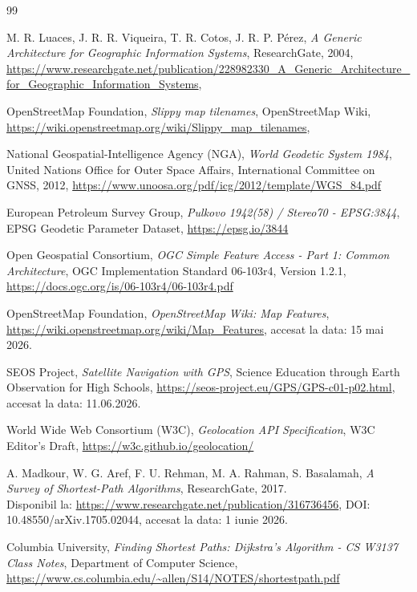 ﻿\documentclass[12pt, a4paper, twoside, romanian]{teza-upb}
\begin{document}
\begin{thebibliography}{99}


M. R. Luaces, J. R. R. Viqueira, T. R. Cotos, J. R. P. Pérez,
\emph{A Generic Architecture for Geographic Information Systems},
ResearchGate, 2004,
\url{https://www.researchgate.net/publication/228982330_A_Generic_Architecture_for_Geographic_Information_Systems},



OpenStreetMap Foundation,
\emph{Slippy map tilenames},
OpenStreetMap Wiki,
\url{https://wiki.openstreetmap.org/wiki/Slippy_map_tilenames},


National Geospatial-Intelligence Agency (NGA),
\emph{World Geodetic System 1984},
United Nations Office for Outer Space Affairs, International Committee on GNSS, 2012,
\url{https://www.unoosa.org/pdf/icg/2012/template/WGS_84.pdf}

European Petroleum Survey Group,
\emph{Pulkovo 1942(58) / Stereo70 - EPSG:3844},
EPSG Geodetic Parameter Dataset,
\url{https://epsg.io/3844}


Open Geospatial Consortium,
\emph{OGC Simple Feature Access - Part 1: Common Architecture},
OGC Implementation Standard 06-103r4, Version 1.2.1,
\url{https://docs.ogc.org/is/06-103r4/06-103r4.pdf}


OpenStreetMap Foundation,
\textit{OpenStreetMap Wiki: Map Features},
\\\url{https://wiki.openstreetmap.org/wiki/Map_Features},
accesat la data: 15 mai 2026.



SEOS Project,
\emph{Satellite Navigation with GPS},
Science Education through Earth Observation for High Schools,
\url{https://seos-project.eu/GPS/GPS-c01-p02.html},
accesat la data: 11.06.2026.


World Wide Web Consortium (W3C),
\emph{Geolocation API Specification},
W3C Editor's Draft,
\url{https://w3c.github.io/geolocation/}

A. Madkour, W. G. Aref, F. U. Rehman, M. A. Rahman, S. Basalamah,
\textit{A Survey of Shortest-Path Algorithms},
ResearchGate, 2017.
\\Disponibil la: \url{https://www.researchgate.net/publication/316736456},
DOI: 10.48550/arXiv.1705.02044,
accesat la data: 1 iunie 2026.

Columbia University,
\emph{Finding Shortest Paths: Dijkstra's Algorithm - CS W3137 Class Notes},
Department of Computer Science,
\url{https://www.cs.columbia.edu/~allen/S14/NOTES/shortestpath.pdf}


\end{thebibliography}
\end{document}
